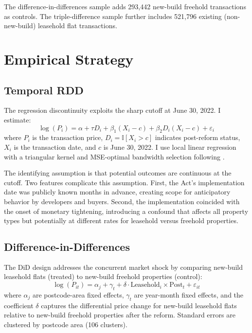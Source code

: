 \documentclass[12pt]{article}
\newcommand{\ind}{\mathbb{I}}
\begin{document}
The difference-in-differences sample adds 293,442 new-build freehold transactions as controls. The triple-difference sample further includes 521,796 existing (non-new-build) leasehold flat transactions.



\section{Empirical Strategy}

\subsection{Temporal RDD}

The regression discontinuity exploits the sharp cutoff at June 30, 2022. I estimate:
\begin{equation}
\log(P_i) = \alpha + \tau D_i + \beta_1 (X_i - c) + \beta_2 D_i (X_i - c) + \varepsilon_i
\label{eq:rdd}
\end{equation}
where $P_i$ is the transaction price, $D_i = \ind[X_i > c]$ indicates post-reform status, $X_i$ is the transaction date, and $c$ is June 30, 2022. I use local linear regression with a triangular kernel and MSE-optimal bandwidth selection following \citet{cattaneo2020}.

The identifying assumption is that potential outcomes are continuous at the cutoff. Two features complicate this assumption. First, the Act's implementation date was publicly known months in advance, creating scope for anticipatory behavior by developers and buyers. Second, the implementation coincided with the onset of monetary tightening, introducing a confound that affects all property types but potentially at different rates for leasehold versus freehold properties.

\subsection{Difference-in-Differences}

The DiD design addresses the concurrent market shock by comparing new-build leasehold flats (treated) to new-build freehold properties (control):
\begin{equation}
\log(P_{it}) = \alpha_j + \gamma_t + \delta \cdot \text{Leasehold}_i \times \text{Post}_t + \varepsilon_{it}
\label{eq:did}
\end{equation}
where $\alpha_j$ are postcode-area fixed effects, $\gamma_t$ are year-month fixed effects, and the coefficient $\delta$ captures the differential price change for new-build leasehold flats relative to new-build freehold properties after the reform. Standard errors are clustered by postcode area (106 clusters).
\end{document}
